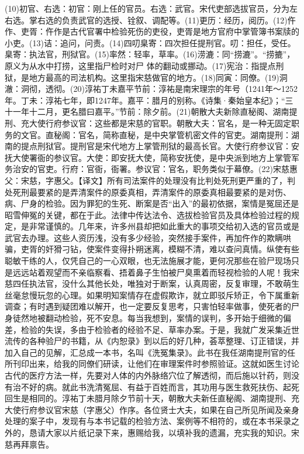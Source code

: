 \documentclass[12pt,UTF8]{ctexbook}
\begin{document}
(10)初官、右选：初官：刚上任的官员。右选：武官。宋代吏部选拔官员，分为左右选。掌右选的负责武官的选授、铨叙、调配等。(11)更历：经历，阅历。(12)仵作、吏胥：仵作是古代官署中检验死伤的吏役，吏胥是地方官府中掌管簿书案牍的小吏。(13)诘：追问，问责。(14)四叨臬寄：四次担任提刑官。叨：担任，受任。臬寄：执法官，刑狱官。(15)率然：轻率，草率。(16)涝漉：同“捞漉”。“捞摝”，原义为从水中打捞，这里指尸检时对尸
体的翻动或挪动。(17)宪治：指提点刑狱，是地方最高的司法机构。这里指宋慈做官的地方。(18)同寅：同僚。(19)洞澈：洞彻，透彻。(20)淳祐丁未嘉平节前：淳祐是南宋理宗的年号（1241年～1252年。丁未：淳祐七年，即1247年。嘉平：腊月的别称。《诗集·秦始皇本纪》；“三十一年十二月，更名腊曰嘉平。”节前：除夕前。(21)朝散大夫新除直秘阁、湖南提刑、充大使行府参议官：这些都是宋慈的官职。朝散大夫：官名，是一种无固定职务的文官。直秘阁：官名，简称直秘，是中央掌管机密文件的官吏。湖南提刑：湖南的提点刑狱官。提刑官是宋代地方上掌管刑狱的最高长官。大使行府参议官：安抚大使署衙的参议官。大使：即安抚大使，简称安抚使，是中央派到地方上掌管军务治安的官吏。行府：官衙，衙署。参议官：官名，职务类似于幕僚。(22)宋慈惠父：宋慈，字惠父。【译文】所有司法案件的处理没有比判处死刑更严重的了，判处死刑最要紧的是弄清案件的原委真相，弄清案件的原委真相最要紧的是对伤、病、尸身的检验。因为罪犯的生死、断案是否“出入”的最初依据，案情是冤屈还是昭雪伸冤的关键，都在于此。法律中传达法令、选拔检验官员及具体检验过程的规定，是非常谨慎的。几年来，许多州县却把如此重大的事项交给初入选的官员或是武官去办理。这些人资历浅，没有多少经验，突然接手案件，再加仵作的欺瞒哄骗，吏胥的奸猾刁钻，使案件变得扑朔迷离，模糊不清，难以查问真情。纵使有些聪敏干练的人，仅凭自己的一心双眼，也无法施展才能，更何况那些在验尸现场只是远远站着观望而不亲临察看、捂着鼻子生怕被尸臭熏着而轻视检验的人呢！我宋慈四任执法官，没什么其他长处，唯独对于断案，认真周密，反复审理，不敢萌生丝毫怠慢玩忽的心理。如果明知案情存在虚假欺诈，就立即驳斥矫正，令下属重新调查；有时遇到疑团难以解开，也一定要反复思考，只害怕轻率做事，使死者的尸身徒然地被翻动检验，死不安息。每当我想到，案情的误判，多开始于细微的偏差，检验的失误，多由于检验者的经验不足、草率办案。于是，我就广发采集近世流传的各种验尸的书籍，从《内恕录》到以后的好几种，荟萃整理、订正错误，并加入自己的见解，汇总成一本书，名叫《洗冤集录》。此书在我任湖南提刑官的任所刊印出来，给我的同僚们研读，让他们在审理案件时参照验证。这就如医生讨论古代的医疗方法一样，先要对人体的内外脉络穴位了解透彻，而后施以针药，则没有治不好的病。就此书洗清冤屈、有益于百姓而言，其功用与医生救死扶伤、起死回生是相同的。淳祐丁未腊月除夕节前十天，朝散大夫新任直秘阁、湖南提刑、充大使行府参议官宋慈（字惠父）作序。各位贤士大夫，如果在自己所见所闻及亲身处理的案子中，发现有与本书记载的检验方法、案例等不相符的，或在本书采录之外的，恳请大家以片纸记录下来，惠赐给我，以填补我的遗漏，充实我的知识。宋慈再拜禀告。
\end{document}
